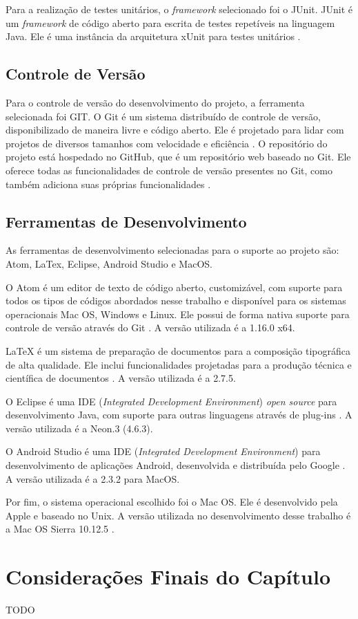 Para a realização de testes unitários, o \textit{framework} selecionado foi o JUnit. JUnit é um \textit{framework} de código aberto para escrita de testes repetíveis na linguagem Java. Ele é uma instância da arquitetura xUnit para testes unitários \cite{junit2015}.

    \subsection{Controle de Versão}

Para o controle de versão do desenvolvimento do projeto, a ferramenta selecionada foi GIT. O Git é um sistema distribuído de controle de versão, disponibilizado de maneira livre e código aberto. Ele é projetado para lidar com projetos de diversos tamanhos com velocidade e eficiência \cite{git}. O repositório do projeto está hospedado no GitHub, que é um repositório web baseado no Git. Ele oferece todas as funcionalidades de controle de versão presentes no Git, como também adiciona suas próprias funcionalidades \cite{gitHub}.

    \subsection{Ferramentas de Desenvolvimento}

As ferramentas de desenvolvimento selecionadas para o suporte ao projeto são: Atom, LaTex, Eclipse, Android Studio e MacOS.

O Atom é um editor de texto de código aberto, customizável, com suporte para todos
os tipos de códigos abordados nesse trabalho e disponível para os sistemas
operacionais Mac OS, Windows e Linux. Ele possui de forma nativa suporte para
controle de versão através do Git \cite{atom}. A versão utilizada é a 1.16.0 x64.

LaTeX é um sistema de preparação de documentos para a composição tipográfica de
alta qualidade. Ele inclui funcionalidades projetadas para a produção técnica e
científica de documentos \cite{latex}. A versão utilizada é a 2.7.5.

O Eclipse é uma IDE (\textit{Integrated Development Environment})
\textit{open source} para desenvolvimento Java, com suporte para outras linguagens
através de plug-ins \cite{eclipse}. A versão utilizada é a Neon.3 (4.6.3).

O Android Studio é uma IDE (\textit{Integrated Development Environment}) para
desenvolvimento de aplicações Android, desenvolvida e distribuída pelo Google
\cite{androidStudio}. A versão utilizada é a 2.3.2 para MacOS.

Por fim, o sistema operacional escolhido foi o Mac OS. Ele é desenvolvido pela Apple e baseado no Unix. A versão utilizada no desenvolvimento desse trabalho é a Mac OS Sierra 10.12.5 \cite{macos}.

\section{Considerações Finais do Capítulo}

TODO
